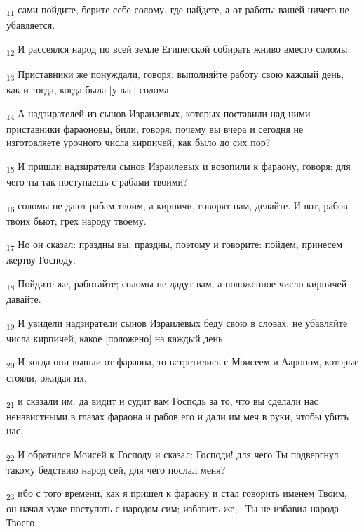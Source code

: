 \begin{tcolorbox}
\textsubscript{11} сами пойдите, берите себе солому, где найдете, а от работы вашей ничего не убавляется.
\end{tcolorbox}
\begin{tcolorbox}
\textsubscript{12} И рассеялся народ по всей земле Египетской собирать жниво вместо соломы.
\end{tcolorbox}
\begin{tcolorbox}
\textsubscript{13} Приставники же понуждали, говоря: выполняйте работу свою каждый день, как и тогда, когда была [у вас] солома.
\end{tcolorbox}
\begin{tcolorbox}
\textsubscript{14} А надзирателей из сынов Израилевых, которых поставили над ними приставники фараоновы, били, говоря: почему вы вчера и сегодня не изготовляете урочного числа кирпичей, как было до сих пор?
\end{tcolorbox}
\begin{tcolorbox}
\textsubscript{15} И пришли надзиратели сынов Израилевых и возопили к фараону, говоря: для чего ты так поступаешь с рабами твоими?
\end{tcolorbox}
\begin{tcolorbox}
\textsubscript{16} соломы не дают рабам твоим, а кирпичи, говорят нам, делайте. И вот, рабов твоих бьют; грех народу твоему.
\end{tcolorbox}
\begin{tcolorbox}
\textsubscript{17} Но он сказал: праздны вы, праздны, поэтому и говорите: пойдем, принесем жертву Господу.
\end{tcolorbox}
\begin{tcolorbox}
\textsubscript{18} Пойдите же, работайте; соломы не дадут вам, а положенное число кирпичей давайте.
\end{tcolorbox}
\begin{tcolorbox}
\textsubscript{19} И увидели надзиратели сынов Израилевых беду свою в словах: не убавляйте числа кирпичей, какое [положено] на каждый день.
\end{tcolorbox}
\begin{tcolorbox}
\textsubscript{20} И когда они вышли от фараона, то встретились с Моисеем и Аароном, которые стояли, ожидая их,
\end{tcolorbox}
\begin{tcolorbox}
\textsubscript{21} и сказали им: да видит и судит вам Господь за то, что вы сделали нас ненавистными в глазах фараона и рабов его и дали им меч в руки, чтобы убить нас.
\end{tcolorbox}
\begin{tcolorbox}
\textsubscript{22} И обратился Моисей к Господу и сказал: Господи! для чего Ты подвергнул такому бедствию народ сей, для чего послал меня?
\end{tcolorbox}
\begin{tcolorbox}
\textsubscript{23} ибо с того времени, как я пришел к фараону и стал говорить именем Твоим, он начал хуже поступать с народом сим; избавить же, --Ты не избавил народа Твоего.
\end{tcolorbox}
